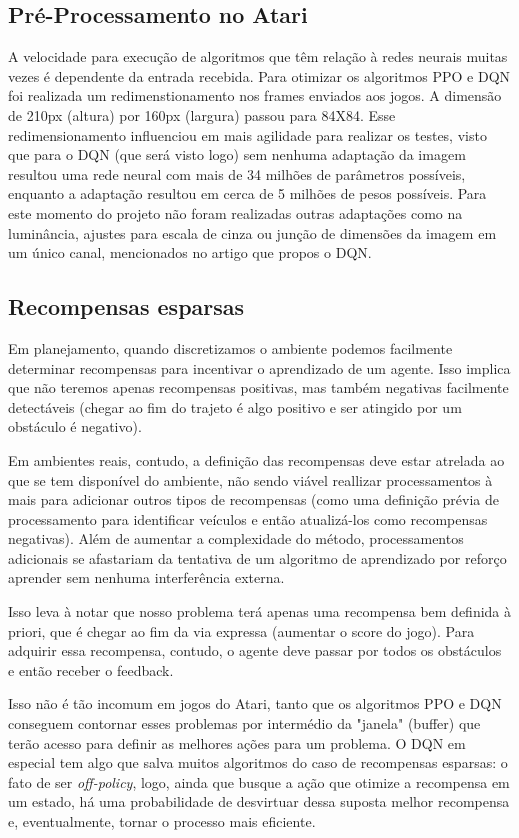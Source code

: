 \documentclass[letterpaper]{article} %
\begin{document}
\subsection{Pré-Processamento no Atari}
A velocidade para execução de algoritmos que têm relação à redes neurais muitas vezes é dependente da entrada recebida. Para otimizar os algoritmos PPO e DQN foi realizada um redimenstionamento nos frames enviados aos jogos. A dimensão de 210px (altura) por 160px (largura) passou para 84X84. Esse redimensionamento influenciou em mais agilidade para realizar os testes, visto que para o DQN (que será visto logo) sem nenhuma adaptação da imagem resultou uma rede neural com mais de 34 milhões de parâmetros possíveis, enquanto a adaptação resultou em cerca de 5 milhões de pesos possíveis. Para este momento do projeto não foram realizadas outras adaptações como na luminância, ajustes para escala de cinza ou junção de dimensões da imagem em um único canal, mencionados no artigo que propos o DQN.

\subsection{Recompensas esparsas}
Em planejamento, quando discretizamos o ambiente podemos facilmente determinar recompensas para incentivar o aprendizado de um agente. Isso implica que não teremos apenas recompensas positivas, mas também negativas facilmente detectáveis (chegar ao fim do trajeto é algo positivo e ser atingido por um obstáculo é negativo).

Em ambientes reais, contudo, a definição das recompensas deve estar atrelada ao que se tem disponível do ambiente, não sendo viável reallizar processamentos à mais para adicionar outros tipos de recompensas (como uma definição prévia de processamento para identificar veículos e então atualizá-los como recompensas negativas). Além de aumentar a complexidade do método, processamentos adicionais se afastariam da tentativa de um algoritmo de aprendizado por reforço aprender sem nenhuma interferência externa.

Isso leva à notar que nosso problema terá apenas uma recompensa bem definida à priori, que é chegar ao fim da via expressa (aumentar o score do jogo). Para adquirir essa recompensa, contudo, o agente deve passar por todos os obstáculos e então receber o feedback.

Isso não é tão incomum em jogos do Atari, tanto que os algoritmos PPO e DQN conseguem contornar esses problemas por intermédio da "janela" (buffer) que terão acesso para definir as melhores ações para um problema. O DQN em especial tem algo que salva muitos algoritmos do caso de recompensas esparsas: o fato de ser \textit{off-policy}, logo, ainda que busque a ação que otimize a recompensa em um estado, há uma probabilidade de desvirtuar dessa suposta melhor recompensa e, eventualmente, tornar o processo mais eficiente.
\end{document}
